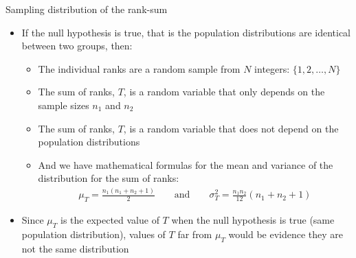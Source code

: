 \documentclass[xcolor=dvipsnames]{beamer}
\begin{document}
\begin{frame}{Sampling distribution of the rank-sum}
	\begin{itemize}
		\item If the null hypothesis is true, that is the population distributions are identical between two groups, then:
		\begin{itemize}
			\item The individual ranks are a random sample from $N$ integers: $\{1, 2, \hdots, N\}$
			\item The sum of ranks, $T$, is a random variable that only depends on the sample sizes $n_1$ and $n_2$
			\item The sum of ranks, $T$, is a random variable that does not depend on the population distributions
			\item And we have mathematical formulas for the mean and variance of the distribution for the sum of ranks:
			\begin{gather*}
			\mu_T = \frac{n_1 (n_1 + n_2 + 1)}{2} \quad \quad \text{and} \quad \quad \sigma_T^{2} = \frac{n_1 n_2}{12}(n_1 +n_2 +1)
			\end{gather*}
		\end{itemize}
	\item Since $\mu_T$ is the expected value of $T$ when the null hypothesis is true (same population distribution), values of $T$ far from $\mu_T$ would be evidence they are not the same distribution
	\end{itemize}
\end{frame}
\end{document}
